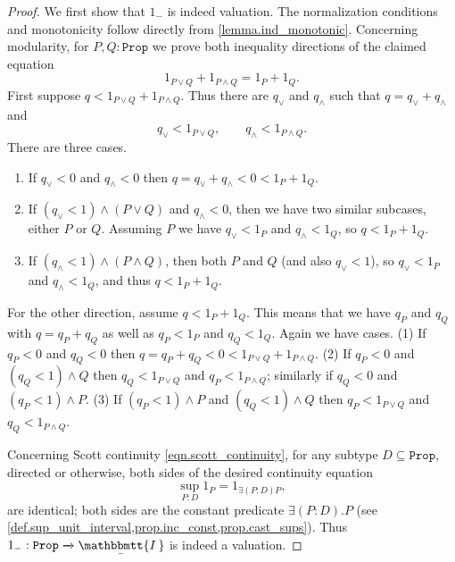 \documentclass[reqno,11pt]{amsproc}
\theoremstyle{plain}
\theoremstyle{definition}
\newcommand{\Const}[1]{\mathtt{#1}}
\renewcommand{\to}[1][]{\xrightarrow{#1}}
\newcommand{\ubar}[1]{\underaccent{\bar}{#1}}
\newcommand{\ind}[1]{1_{#1}}			%
\newcommand{\inc}{\ind{-}}			%
\newcommand{\internal}[1]{\raisebox{-.03ex}{$\mathbbmtt{#1}$}}
\newcommand{\hs}{\hspace{1pt}}
\newcommand{\tii}{\ubar{\internal{I\hs\hs}}\!\hs}
\newcommand{\prop}{\Const{Prop}}
\numberwithin{equation}{section}
\begin{document}
\begin{proof}
	We first show that $\inc$ is indeed valuation. The normalization conditions and monotonicity follow directly from \cref{lemma.ind_monotonic}. 	Concerning modularity, for $P,Q : \prop$ we prove both inequality directions of the claimed equation
	\[
		\ind{P \lor Q} + \ind{P \land Q} = \ind P + \ind Q.
	\]
	First suppose $q < \ind{P \lor Q} + \ind{P \land Q}$. Thus there are $q_\lor$ and $q_\land$ such that $q = q_\lor + q_\land$ and
	\[
		q_\lor < \ind{P \lor Q}, \qquad q_\land < \ind{P \land Q}.
	\]
	There are three cases.
	\begin{enumerate}[label=(\arabic*)]
		\item If $q_\lor<0$ and $q_\wedge<0$ then $q=q_\lor+q_\wedge<0<\ind P + \ind Q$.
		\item If  $(q_\lor<1)\wedge(P\lor Q)$ and $q_\wedge<0$, then we have two similar subcases, either $P$ or $Q$. Assuming $P$ we have $q_\lor<\ind P$ and $q_\wedge<\ind Q$, so $q<\ind P+\ind Q$.
		\item If $(q_\wedge<1)\wedge(P\wedge Q)$, then both $P$ and $Q$ (and also $q_\lor<1$), so $q_\lor<\ind P$ and $q_\wedge<\ind Q$, and thus $q<\ind P + \ind Q$.
	\end{enumerate}
	
	For the other direction, assume $q < \ind{P} + \ind{Q}$. This means that we have $q_P$ and $q_Q$ with $q = q_P + q_Q$ as well as $q_P < \ind{P}$ and $q_Q < \ind{Q}$. Again we have cases. (1) If $q_P<0$ and $q_Q<0$ then $q=q_P + q_Q<0<\ind{P \lor Q} + \ind{P \land Q}$. (2) If $q_P<0$ and $(q_Q<1)\wedge Q$ then $q_Q<\ind{P\lor Q}$ and $q_P<\ind{P\wedge Q}$; similarly if $q_Q<0$ and $(q_P<1)\wedge P$. (3) If $(q_P<1)\wedge P$ and $(q_Q<1)\wedge Q$ then $q_P<\ind{P\lor Q}$ and $q_Q<\ind{P\wedge Q}$.
	
	

	Concerning Scott continuity \eqref{eqn.scott_continuity}, for any subtype $D \subseteq \prop$, directed or otherwise, both sides of the desired continuity equation
	\[
		\sup_{P : D} \ind{P} = \ind{\exists (P:D) P},
	\]
	are identical; both sides are the constant predicate $\exists(P:D).P$ (see \cref{def.sup_unit_interval,prop.inc_const,prop.cast_sups}). Thus $\inc : \prop \to \tii$ is indeed a valuation.
\end{proof}
\end{document}
